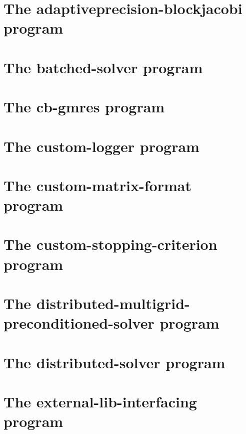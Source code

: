 \let\mypdfximage\pdfximage\def\pdfximage{\immediate\mypdfximage}\documentclass[twoside]{book}
\newcommand{\+}{\discretionary{\mbox{\scriptsize$\hookleftarrow$}}{}{}}
\begin{document}
\chapter{The adaptiveprecision-\/blockjacobi program}
\label{adaptiveprecision_blockjacobi}

\chapter{The batched-\/solver program}
\label{batched_solver}

\chapter{The cb-\/gmres program}
\label{cb_gmres}

\chapter{The custom-\/logger program}
\label{custom_logger}

\chapter{The custom-\/matrix-\/format program}
\label{custom_matrix_format}

\chapter{The custom-\/stopping-\/criterion program}
\label{custom_stopping_criterion}

\chapter{The distributed-\/multigrid-\/preconditioned-\/solver program}
\label{distributed_multigrid_preconditioned_solver}

\chapter{The distributed-\/solver program}
\label{distributed_solver}

\chapter{The external-\/lib-\/interfacing program}
\label{external_lib_interfacing}

\end{document}
